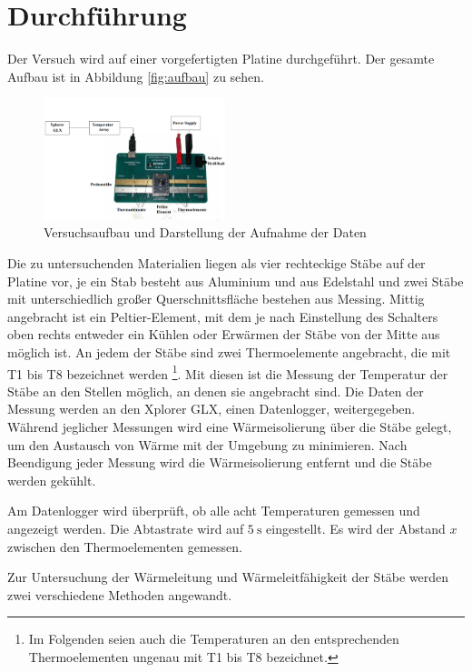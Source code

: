 \section{Durchführung}
\label{sec:Durchführung}
Der Versuch wird auf einer vorgefertigten Platine durchgeführt. Der gesamte Aufbau
ist in Abbildung \ref{fig:aufbau} zu sehen.

\begin{figure}
  \centering
  \includegraphics[width=150pt]{data/aufbau.png}
  \caption{Versuchsaufbau und Darstellung der Aufnahme der Daten \cite{Versuchsanleitung}}
  \label{fig:schaltbild1}
\end{figure}

Die zu untersuchenden Materialien liegen als vier rechteckige Stäbe auf der Platine vor,
je ein Stab besteht aus Aluminium und aus Edelstahl und zwei Stäbe mit unterschiedlich
großer Querschnittsfläche bestehen aus Messing. Mittig angebracht ist ein Peltier-Element,
mit dem je nach Einstellung des Schalters oben rechts entweder ein Kühlen oder
Erwärmen der Stäbe von der Mitte aus möglich ist. An jedem der Stäbe sind zwei
Thermoelemente angebracht, die mit T1 bis T8 bezeichnet werden
\footnote{Im Folgenden seien auch die Temperaturen an den entsprechenden Thermoelementen ungenau mit T1 bis T8 bezeichnet.}.
Mit diesen ist die Messung der Temperatur der Stäbe an den Stellen möglich,
an denen sie angebracht sind. Die Daten der Messung werden an den Xplorer GLX, einen Datenlogger, weitergegeben.
Während jeglicher Messungen wird eine Wärmeisolierung über die Stäbe gelegt, um
den Austausch von Wärme mit der Umgebung zu minimieren. Nach Beendigung jeder Messung
wird die Wärmeisolierung entfernt und die Stäbe werden gekühlt.

Am Datenlogger wird überprüft, ob alle acht Temperaturen gemessen und angezeigt werden.
Die Abtastrate wird auf $\SI{5}{\second}$ eingestellt.
Es wird der Abstand $x$ zwischen den Thermoelementen gemessen.

Zur Untersuchung der Wärmeleitung und Wärmeleitfähigkeit der Stäbe werden zwei
verschiedene Methoden angewandt.

